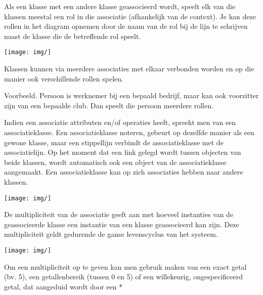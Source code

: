 
Als een klasse met een andere klasse geassocieerd wordt, speelt elk van die klassen meestal een rol in die associatie (afhankelijk van de context). Je kan deze rollen in het diagram opnemen door de naam van de rol bij de lijn te schrijven naast de klasse die de betreffende rol speelt.


\begin{center}
\texttt{[image: img/]}%
\label{labelname}%
\end{center}

Klassen kunnen via meerdere associaties met elkaar verbonden worden en op die manier ook verschillende rollen spelen.

Voorbeeld. Persoon is werknemer bij een bepaald bedrijf, maar kan ook voorzitter zijn van een bepaalde club. Dan speelt die persoon meerdere rollen.


Indien een associatie attributen en/of operaties heeft, spreekt men van een associatieklasse. Een associatieklasse noteren, gebeurt op dezelfde manier als een gewone klasse, maar een stippellijn verbindt de associatieklasse met de associatielijn. Op het moment dat een link gelegd wordt tussen objecten van beide klassen, wordt automatisch ook een object van de associatieklasse aangemaakt.
Een associatieklasse kan op zich associaties hebben naar andere klassen.


\begin{center}
\texttt{[image: img/]}%
\label{labelname}%
\end{center}


De multipliciteit van de associatie geeft aan met hoeveel instanties van de geassocieerde klasse een instantie van een klasse geassocieerd kan zijn. Deze multipliciteit geldt gedurende de ganse levenscyclus van het systeem.


\begin{center}
\texttt{[image: img/]}%
\label{labelname}%
\end{center}

Om een multipliciteit op te geven kan men gebruik maken van een exact getal (bv. 5), een getallenbereik (tussen 0 en 5) of een willekeurig, ongespecificeerd getal, dat aangeduid wordt door een *

